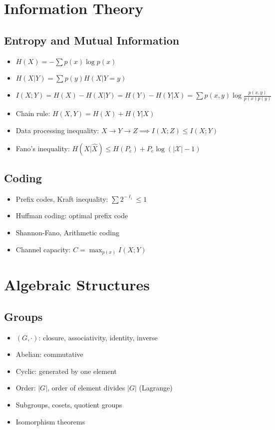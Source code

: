 \section{Information Theory}

\subsection{Entropy and Mutual Information}
\begin{itemize}
\item $H(X) = -\sum p(x) \log p(x)$
\item $H(X|Y) = \sum p(y) H(X|Y=y)$
\item $I(X;Y) = H(X) - H(X|Y) = H(Y) - H(Y|X) = \sum p(x,y) \log \frac{p(x,y)}{p(x)p(y)}$
\item Chain rule: $H(X,Y) = H(X) + H(Y|X)$
\item Data processing inequality: $X \to Y \to Z \implies I(X;Z) \le I(X;Y)$
\item Fano's inequality: $H(X|\hat{X}) \le H(P_e) + P_e \log(|\mathcal{X}|-1)$
\end{itemize}

\subsection{Coding}
\begin{itemize}
\item Prefix codes, Kraft inequality: $\sum 2^{-\ell_i} \le 1$
\item Huffman coding: optimal prefix code
\item Shannon-Fano, Arithmetic coding
\item Channel capacity: $C = \max_{p(x)} I(X;Y)$
\end{itemize}

\section{Algebraic Structures}

\subsection{Groups}
\begin{itemize}
\item $(G, \cdot)$: closure, associativity, identity, inverse
\item Abelian: commutative
\item Cyclic: generated by one element
\item Order: $|G|$, order of element divides $|G|$ (Lagrange)
\item Subgroups, cosets, quotient groups
\item Isomorphism theorems
\end{itemize}

